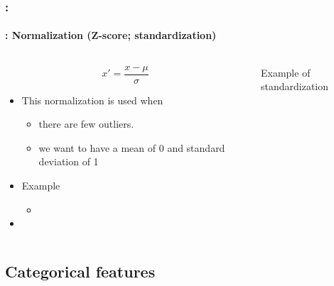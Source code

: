\documentclass[xcolor=table]{beamer}
\begin{document}
\begin{frame}
	\frametitle{\insertshortsubtitle: \insertsection}
	\framesubtitle{\insertsubsection: Normalization (Z-score; standardization)}
	
	\begin{columns}
	\begin{column}{.5\textwidth}
	\[x' = \frac{x - \mu}{\sigma}	\]
	
	\begin{itemize}
		\item This normalization is used when
		\begin{itemize}
			\item there are few outliers.
			\item we want to have a mean of 0 and standard deviation of 1
		\end{itemize}
		\item Example
		\begin{itemize}
			\item {}
		\end{itemize}
		\item {}
	\end{itemize}
	\end{column}
	\begin{column}{.5\textwidth}
		
		\begin{center}
			Example of standardization \cite{2021-google-prep}
		\end{center}
	\end{column}
\end{columns}
	
\end{frame}


\subsection{Categorical features}
\end{document}
